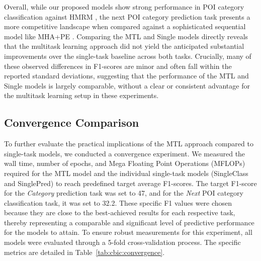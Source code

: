 Overall, while our proposed models show strong performance in POI category classification against HMRM \cite{chen2020modeling}, the next POI category prediction task presents a more competitive landscape when compared against a sophisticated sequential model like MHA+PE \cite{zeng2019next}. Comparing the MTL and Single models directly reveals that the multitask learning approach did not yield the anticipated substantial improvements over the single-task baseline across both tasks. Crucially, many of these observed differences in F1-scores are minor and often fall within the reported standard deviations, suggesting that the performance of the MTL and Single models is largely comparable, without a clear or consistent advantage for the multitask learning setup in these experiments.

\subsection{Convergence Comparison}
To further evaluate the practical implications of the MTL approach compared to single-task models, we conducted a convergence experiment. We measured the wall time, number of epochs, and Mega Floating Point Operations (MFLOPs) required for the MTL model and the individual single-task models (SingleClass and SinglePred) to reach predefined target average F1-scores. The target F1-score for the \textit{Category} prediction task was set to 47, and for the \textit{Next} POI category classification task, it was set to 32.2. These specific F1 values were chosen because they are close to the best-achieved results for each respective task, thereby representing a comparable and significant level of predictive performance for the models to attain. To ensure robust measurements for this experiment, all models were evaluated through a 5-fold cross-validation process. The specific metrics are detailed in Table~\ref{tab:cbic:convergence}.

